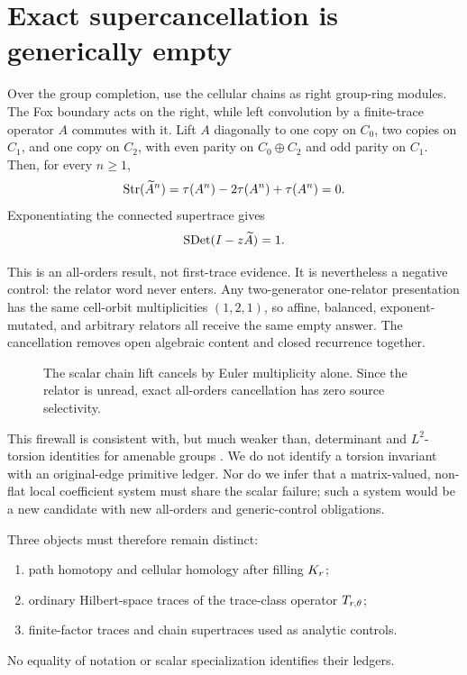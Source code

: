 \section{Exact supercancellation is generically empty}
\label{sec:superdet}

Over the group completion, use the cellular chains as right group-ring
modules.  The Fox boundary acts on the right, while left convolution by a
finite-trace operator $A$ commutes with it.  Lift $A$ diagonally to one copy
on $C_0$, two copies on $C_1$, and one copy on $C_2$, with even parity on
$C_0\oplus C_2$ and odd parity on $C_1$.  Then, for every $n\ge1$,
\[
\operatorname{Str}(\widetilde A^n)
=\tau(A^n)-2\tau(A^n)+\tau(A^n)=0.
\]
Exponentiating the connected supertrace gives
\[
\operatorname{SDet}(I-z\widetilde A)=1.
\]

This is an all-orders result, not first-trace evidence.  It is nevertheless a
negative control: the relator word never enters.  Any two-generator
one-relator presentation has the same cell-orbit multiplicities $(1,2,1)$,
so affine, balanced, exponent-mutated, and arbitrary relators all receive the
same empty answer.  The cancellation removes open algebraic content and
closed recurrence together.

\begin{figure}[H]
\centering

\caption{The scalar chain lift cancels by Euler multiplicity alone.  Since the
relator is unread, exact all-orders cancellation has zero source selectivity.}
\label{fig:superdet}
\end{figure}

This firewall is consistent with, but much weaker than, determinant and
$L^2$-torsion identities for amenable groups \citep{LiThom2014}.  We do not
identify a torsion invariant with an original-edge primitive ledger.  Nor do
we infer that a matrix-valued, non-flat local coefficient system must share
the scalar failure; such a system would be a new candidate with new
all-orders and generic-control obligations.

Three objects must therefore remain distinct:
\begin{enumerate}
\item path homotopy and cellular homology after filling $K_r$;
\item ordinary Hilbert-space traces of the trace-class operator $T_{r,\theta}$;
\item finite-factor traces and chain supertraces used as analytic controls.
\end{enumerate}
No equality of notation or scalar specialization identifies their ledgers.
